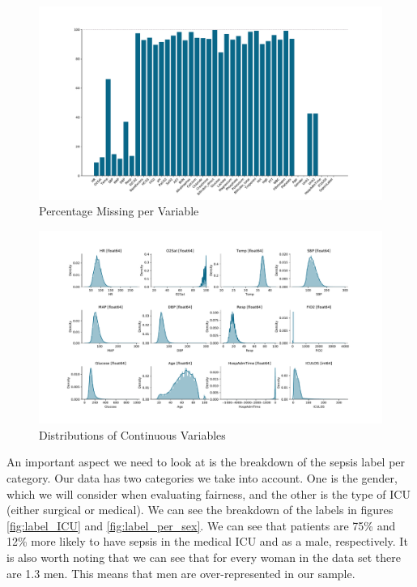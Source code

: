 \documentclass[10pt,letterpaper]{article}
\begin{document}


\begin{figure}[htbp!]
    \centering
    \includegraphics[scale = 0.45]{var_missing_hist.pdf}
    \caption{Percentage Missing per Variable}
    \label{fig:var_missings}
\end{figure}

\begin{figure}[htbp!]
    \centering
    \includegraphics[scale = 0.45]{var_dists.pdf}
    \caption{Distributions of Continuous Variables}
    \label{fig:var_dists}
\end{figure}

\par An important aspect we need to look at is the breakdown of the sepsis label per category. Our data has two categories we take into account. One is the gender, which we will consider when evaluating fairness, and the other is the type of ICU (either surgical or medical). We can see the breakdown of the labels in figures \ref{fig:label_ICU} and \ref{fig:label_per_sex}. We can see that patients are 75\% and 12\% more likely to have sepsis in the medical ICU and as a male, respectively. It is also worth noting that we can see that for every woman in the data set there are 1.3 men. This means that men are over-represented in our sample.
\end{document}
